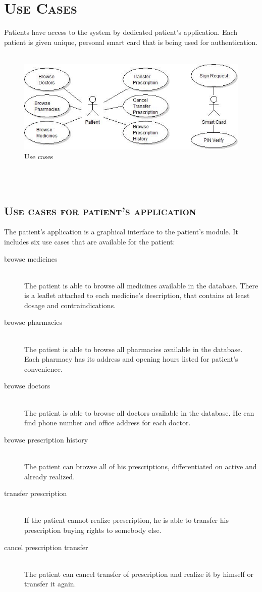 \documentclass[12pt,titlepage]{article}
\begin{document}
\newpage

\section{\textsc{Use Cases}}
Patients have access to the system by dedicated patient's application. 
Each patient is given unique, personal smart card that is being used for authentication.
\\
\\
\begin{figure}
\includegraphics[width=\linewidth]{useCaseDiagram}
\caption{Use cases}
\end{figure}
\\
\\
\subsection{\textsc{Use cases for patient's application}}
The patient's application is a graphical interface to the patient's module. 
It includes six use cases that are available for the patient:
\begin{description}
\item[browse medicines] \hfill \\
The patient is able to browse all medicines available in the database. 
There is a leaflet attached to each medicine's description, that contains at least dosage and contraindications.
\item[browse pharmacies] \hfill \\
The patient is able to browse all pharmacies available in the database. 
Each pharmacy has its address and opening hours listed for patient's convenience.
\item[browse doctors] \hfill \\
The patient is able to browse all doctors available in the database. 
He can find phone number and office address for each doctor.
\item[browse prescription history] \hfill \\
The patient can browse all of his prescriptions, differentiated on active and already realized.
\item[transfer prescription] \hfill \\
If the patient cannot realize prescription, he is able to transfer his prescription buying rights to somebody else.
\item[cancel prescription transfer] \hfill \\
The patient can cancel transfer of prescription and realize it by himself or transfer it again.
\end{description}
\end{document}
